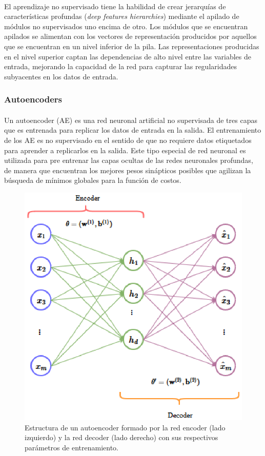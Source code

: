 \documentclass[12pt]{article}
\begin{document}
\paragraph{}
El aprendizaje no supervisado tiene la habilidad de crear jerarquías de características profundas (\textit{deep features hierarchies}) mediante el apilado de módulos no supervisados uno encima de otro. Los módulos que se encuentran apilados se alimentan con los vectores de representación producidos por aquellos que se encuentran en un nivel inferior de la pila. Las representaciones producidas en el nivel superior captan las dependencias de alto nivel entre las variables de entrada, mejorando la capacidad de la red para capturar las regularidades subyacentes en los datos de entrada.

\subsubsection{Autoencoders}
\paragraph{}
Un autoencoder (AE) es una red neuronal artificial no supervisada de tres capas que es entrenada para replicar los datos de entrada en la salida. El entrenamiento de los AE es no supervisado en el sentido de que no requiere datos etiquetados para aprender a replicarlos en la salida. Este tipo especial de red neuronal es utilizada para pre entrenar las capas ocultas de las redes neuronales profundas, de manera que encuentran los mejores pesos sinápticos posibles que agilizan la búsqueda de mínimos globales para la función de costos. 

\begin{figure}[ht]
  \centering
    \includegraphics{./AE.eps}
  \caption{Estructura de un autoencoder formado por la red encoder (lado izquierdo) y la red decoder (lado derecho) con sus respectivos parámetros de entrenamiento.}
  \label{fig:ae}
\end{figure}
\end{document}
